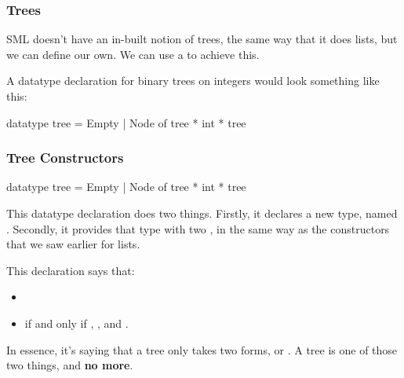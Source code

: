 \documentclass[aspectratio=169]{beamer}
\begin{document}
\begin{frame}[fragile]
  \frametitle{Trees}

  SML doesn't have an in-built notion of trees, the same way that it does lists, but we can
  define our own. We can use a  to achieve this.

  \pause
  \vspace{\fill}


  \pause
  \vspace{\fill}

  A datatype declaration for binary trees on integers would look something like this:
  \begin{codeblock}
    datatype tree = Empty | Node of tree * int * tree
  \end{codeblock}
\end{frame}

\begin{frame}[fragile]
  \frametitle{Tree Constructors}

  \begin{codeblock}
    datatype tree = Empty | Node of tree * int * tree
  \end{codeblock}

  \vspace{\fill}

  This datatype declaration does two things. Firstly, it declares a new type, named .
  Secondly, it provides that type with two , in the same way as the constructors
  that we saw earlier for lists.

  \pause
  \vspace{\fill}

  This declaration says that:
  \pause
  \begin{itemize}
    \item {} \pause
    \item {} if and only if , , and . \pause
  \end{itemize}

  \vspace{\fill}

  In essence, it's saying that a tree only takes two forms,  or . A tree
  is one of those two things, and \textbf{no more}.
\end{frame}
\end{document}
